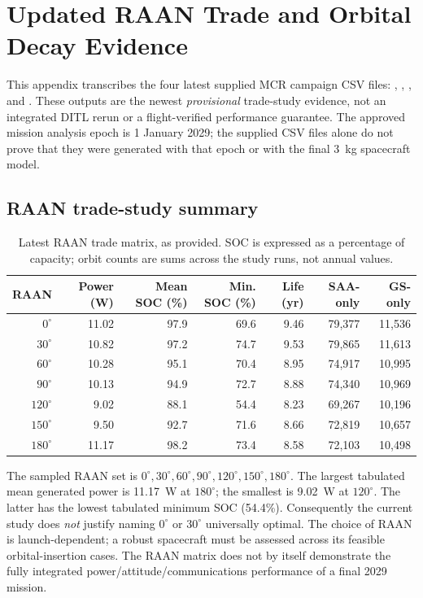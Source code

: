 \section{Updated RAAN Trade and Orbital Decay Evidence}\label{app:updated-raan}
This appendix transcribes the four latest supplied MCR campaign CSV files: , , , and . These outputs are the newest \emph{provisional} trade-study evidence, not an integrated DITL rerun or a flight-verified performance guarantee. The approved mission analysis epoch is 1 January 2029; the supplied CSV files alone do not prove that they were generated with that epoch or with the final 3~kg spacecraft model.

\subsection{RAAN trade-study summary}
\begin{table}[htbp]\centering\footnotesize
\caption{Latest RAAN trade matrix, as provided. SOC is expressed as a percentage of capacity; orbit counts are sums across the study runs, not annual values.}\label{tab:raan-updated}
\begin{tabular}{@{}rrrrrrr@{}}\toprule
RAAN & Power (W) & Mean SOC (\%) & Min. SOC (\%) & Life (yr) & SAA-only & GS-only\\\midrule
$0^\circ$ & 11.02 & 97.9 & 69.6 & 9.46 & 79,377 & 11,536 \\
$30^\circ$ & 10.82 & 97.2 & 74.7 & 9.53 & 79,865 & 11,613 \\
$60^\circ$ & 10.28 & 95.1 & 70.4 & 8.95 & 74,917 & 10,995 \\
$90^\circ$ & 10.13 & 94.9 & 72.7 & 8.88 & 74,340 & 10,969 \\
$120^\circ$ & 9.02 & 88.1 & 54.4 & 8.23 & 69,267 & 10,196 \\
$150^\circ$ & 9.50 & 92.7 & 71.6 & 8.66 & 72,819 & 10,657 \\
$180^\circ$ & 11.17 & 98.2 & 73.4 & 8.58 & 72,103 & 10,498 \\
\bottomrule\end{tabular}\end{table}
The sampled RAAN set is $0^\circ,30^\circ,60^\circ,90^\circ,120^\circ,150^\circ,180^\circ$. The largest tabulated mean generated power is 11.17~W at $180^\circ$; the smallest is 9.02~W at $120^\circ$. The latter has the lowest tabulated minimum SOC (54.4\%). Consequently the current study does \emph{not} justify naming $0^\circ$ or $30^\circ$ universally optimal. The choice of RAAN is launch-dependent; a robust spacecraft must be assessed across its feasible orbital-insertion cases. The RAAN matrix does not by itself demonstrate the fully integrated power/attitude/communications performance of a final 2029 mission.

